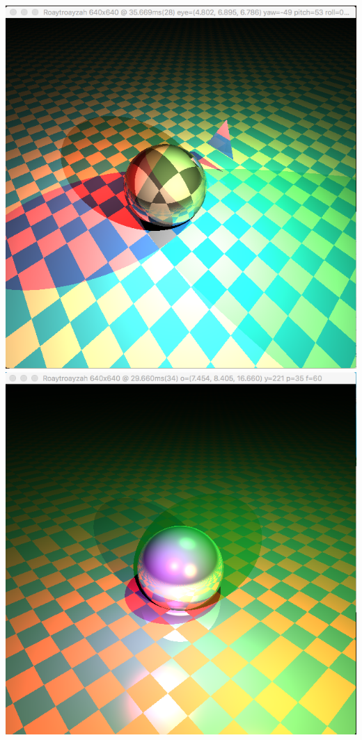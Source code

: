 \includegraphics[width=\textwidth]{img/classic}
\includegraphics[width=\textwidth]{img/colPointLights1sphere}
